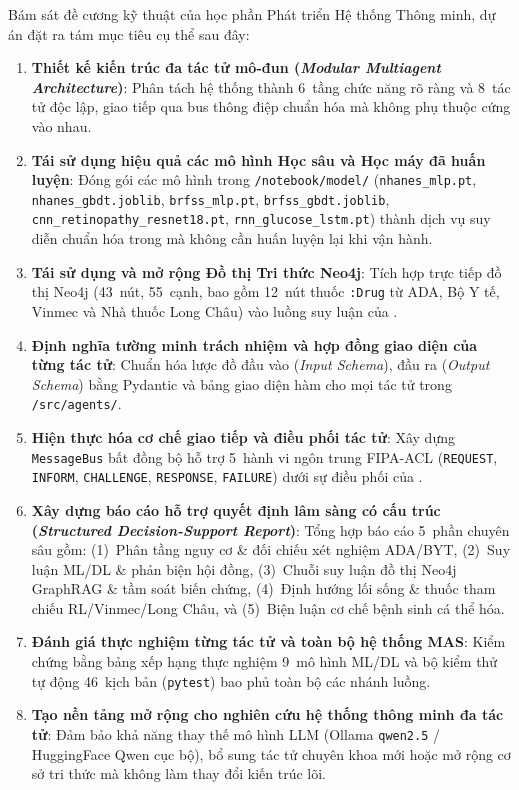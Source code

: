 Bám sát đề cương kỹ thuật của học phần Phát triển Hệ thống Thông minh, dự án đặt ra tám mục tiêu cụ thể sau đây:
\begin{enumerate}
  \item \textbf{Thiết kế kiến trúc đa tác tử mô-đun (\emph{Modular Multiagent Architecture})}: Phân tách hệ thống thành 6~tầng chức năng rõ ràng và 8~tác tử độc lập, giao tiếp qua bus thông điệp chuẩn hóa mà không phụ thuộc cứng vào nhau.
  \item \textbf{Tái sử dụng hiệu quả các mô hình Học sâu và Học máy đã huấn luyện}: Đóng gói các mô hình trong \texttt{/notebook/model/} (\texttt{nhanes\_mlp.pt}, \texttt{nhanes\_gbdt.joblib}, \texttt{brfss\_mlp.pt}, \texttt{brfss\_gbdt.joblib}, \texttt{cnn\_retinopathy\_resnet18.pt}, \texttt{rnn\_glucose\_lstm.pt}) thành dịch vụ suy diễn chuẩn hóa trong  mà không cần huấn luyện lại khi vận hành.
  \item \textbf{Tái sử dụng và mở rộng Đồ thị Tri thức Neo4j}: Tích hợp trực tiếp đồ thị Neo4j (43~nút, 55~cạnh, bao gồm 12~nút thuốc \texttt{:Drug} từ ADA, Bộ Y tế, Vinmec và Nhà thuốc Long Châu) vào luồng suy luận của .
  \item \textbf{Định nghĩa tường minh trách nhiệm và hợp đồng giao diện của từng tác tử}: Chuẩn hóa lược đồ đầu vào (\emph{Input Schema}), đầu ra (\emph{Output Schema}) bằng Pydantic và bảng giao diện hàm cho mọi tác tử trong \texttt{/src/agents/}.
  \item \textbf{Hiện thực hóa cơ chế giao tiếp và điều phối tác tử}: Xây dựng \texttt{MessageBus} bất đồng bộ hỗ trợ 5~hành vi ngôn trung FIPA-ACL (\texttt{REQUEST}, \texttt{INFORM}, \texttt{CHALLENGE}, \texttt{RESPONSE}, \texttt{FAILURE}) dưới sự điều phối của .
  \item \textbf{Xây dựng báo cáo hỗ trợ quyết định lâm sàng có cấu trúc (\emph{Structured Decision-Support Report})}: Tổng hợp báo cáo 5~phần chuyên sâu gồm: (1)~Phân tầng nguy cơ \& đối chiếu xét nghiệm ADA/BYT, (2)~Suy luận ML/DL \& phản biện hội đồng, (3)~Chuỗi suy luận đồ thị Neo4j GraphRAG \& tầm soát biến chứng, (4)~Định hướng lối sống \& thuốc tham chiếu RL/Vinmec/Long Châu, và (5)~Biện luận cơ chế bệnh sinh cá thể hóa.
  \item \textbf{Đánh giá thực nghiệm từng tác tử và toàn bộ hệ thống MAS}: Kiểm chứng bằng bảng xếp hạng thực nghiệm 9~mô hình ML/DL và bộ kiểm thử tự động 46~kịch bản (\texttt{pytest}) bao phủ toàn bộ các nhánh luồng.
  \item \textbf{Tạo nền tảng mở rộng cho nghiên cứu hệ thống thông minh đa tác tử}: Đảm bảo khả năng thay thế mô hình LLM (Ollama \texttt{qwen2.5} / HuggingFace Qwen cục bộ), bổ sung tác tử chuyên khoa mới hoặc mở rộng cơ sở tri thức mà không làm thay đổi kiến trúc lõi.
\end{enumerate}
